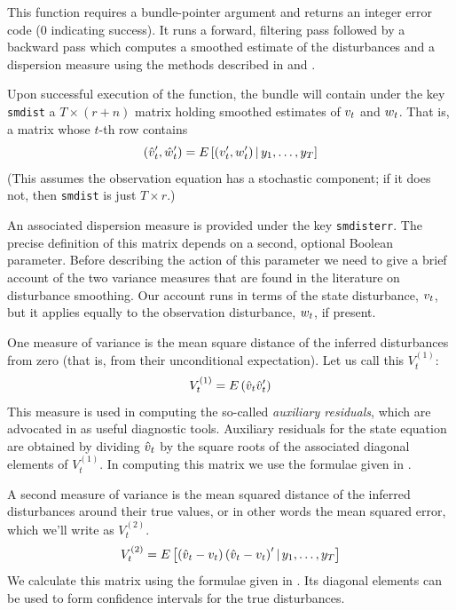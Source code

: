 \documentclass[a4paper]{article}
\begin{document}
This function requires a bundle-pointer argument and returns an
integer error code (0 indicating success).  It runs a forward,
filtering pass followed by a backward pass which computes a smoothed
estimate of the disturbances and a dispersion measure using the
methods described in \cite{koopman93} and \cite{koopman-etal99}.

Upon successful execution of the function, the bundle will contain
under the key \texttt{smdist} a $T \times (r+n)$ matrix holding
smoothed estimates of $v_t$ and $w_t$. That is, a matrix
whose $t$-th row contains
\[
(\hat{v}_t' , \hat{w}_t')
 = E\left[ (v_t' , w_t') \,| \,
   y_1, \ldots, y_T \right]
\]
(This assumes the observation equation has a stochastic component; if
it does not, then \texttt{smdist} is just $T \times r$.)

An associated dispersion measure is provided under the key
\texttt{smdisterr}. The precise definition of this matrix depends on a
second, optional Boolean parameter. Before describing the action of
this parameter we need to give a brief account of the two variance
measures that are found in the literature on disturbance
smoothing. Our account runs in terms of the state disturbance,
$v_t$, but it applies equally to the observation disturbance,
$w_t$, if present.

One measure of variance is the mean square distance of the inferred
disturbances from zero (that is, from their unconditional
expectation). Let us call this $V^{(1)}_t$:
\[
V^{(1)}_t = E\left(\hat{v}_t\hat{v}_t'\right)
\]
This measure is used in computing the so-called \emph{auxiliary
  residuals}, which are advocated in \cite{durbin-koopman12} as useful
diagnostic tools. Auxiliary residuals for the state equation are
obtained by dividing $\hat{v}_t$ by the square roots of the
associated diagonal elements of $V^{(1)}_t$. In computing this matrix
we use the formulae given in \citet[section 4.4]{koopman-etal99}.

A second measure of variance is the mean squared distance of the
inferred disturbances around their true values, or in other words the
mean squared error, which we'll write as $V^{(2)}_t$.
\[
V^{(2)}_t = E\left[\left(\hat{v}_t - v_t\right)
  \left(\hat{v}_t - v_t\right)'
  | \,y_1, \ldots, y_T \right]
\] 
We calculate this matrix using the formulae given in \citet[section
4.5.2]{durbin-koopman12}. Its diagonal elements can be used to form
confidence intervals for the true disturbances.
\end{document}
